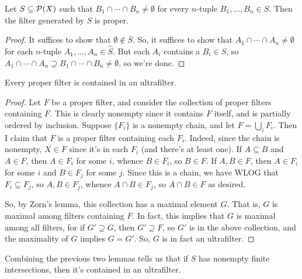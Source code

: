 \documentclass[12pt]{exam}
\begin{document}
\begin{lem} Let $S \subseteq \mathcal{P}(X)$ such that $B_1 \cap \cdots \cap B_n \neq \emptyset$ for every $n$-tuple $B_1,\ldots,B_n \in S$. Then the filter generated by $S$ is proper. \end{lem}
\begin{proof}
	It suffices to show that $\emptyset \notin \bar{S}$. So, it suffices to show that $A_1 \cap \cdots \cap A_n \neq \emptyset$ for each $n$-tuple $A_1,\ldots,A_n \in \hat{S}$. But each $A_i$ contains a $B_i \in S$, so $A_1 \cap \cdots \cap A_n \supseteq B_1 \cap \cdots \cap B_n \neq \emptyset$, so we're done.
\end{proof}

\begin{lem} Every proper filter is contained in an ultrafilter. \end{lem}
\begin{proof}
	Let $F$ be a proper filter, and consider the collection of proper filters containing $F$. This is clearly nonempty since it contains $F$ itself, and is partially ordered by inclusion. Suppose $\{F_i\}$ is a nonempty chain, and let $F = \bigcup_i F_i$. Then I claim that $F$ is a proper filter containing each $F_i$. Indeed, since the chain is nonempty, $X \in F$ since it's in each $F_i$ (and there's at least one). If $A \subseteq B$ and $A \in F$, then $A \in F_i$ for some $i$, whence $B \in F_i$, so $B \in F$. If $A,B \in F$, then $A \in F_i$ for some $i$ and $B \in F_j$ for some $j$. Since this is a chain, we have WLOG that $F_i \subseteq F_j$, so $A,B \in F_j$, whence $A \cap B \in F_j$, so $A \cap B \in F$ as desired.
	
	So, by Zorn's lemma, this collection has a maximal element $G$. That is, $G$ is maximal among filters containing $F$. In fact, this implies that $G$ is maximal among all filters, for if $G' \supseteq G$, then $G' \supseteq F$, so $G'$ is in the above collection, and the maximality of $G$ implies $G = G'$. So, $G$ is in fact an ultrafilter.
\end{proof}

Combining the previous two lemmas tells us that if $S$ has nonempty finite intersections, then it's contained in an ultrafilter.
\end{document}
